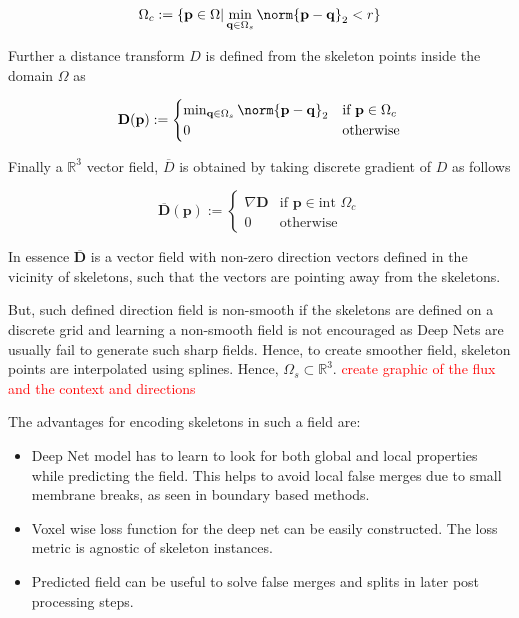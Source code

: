 \DeclarePairedDelimiter\norm\lVert\rVert

\begin{equation}
{\Omega}_c := \{ \mathbf{p} \in \Omega \vert \min_{\mathbf{q} \in \Omega_s} \norm{\mathbf{p} - \mathbf{q}}_2 < r \} 
\end{equation}

Further a distance transform $D$ is defined from the skeleton points inside the domain $\Omega$ as

\begin{equation}
\mathbf{D}(\mathbf{p}) := \begin{cases}
		\min_{\mathbf{q} \in \Omega_s} \norm{\mathbf{p}-\mathbf{q}}_2 & \text{if } \mathbf{p} \in \Omega_c \\
		0  & \text{otherwise}
		\end{cases} 
\end{equation}

Finally a $\mathbb{R}^3$ vector field, $\overline{D}$ is obtained by taking discrete gradient of $D$ as follows

\begin{equation}
 \overline{\mathbf{D}}(\mathbf{p}) := \begin{cases}
 \nabla \mathbf{D} & \text{if } \mathbf{p} \in \text{int } \Omega_c \\
 0  & \text{otherwise}
 \end{cases} 
\end{equation}
 
In essence $\overline{\mathbf{D}}$ is a vector field with non-zero direction vectors defined in the vicinity of skeletons, such that the vectors are pointing away from the skeletons.

But, such defined direction field is non-smooth if the skeletons are defined on a discrete grid and learning a non-smooth field is not encouraged as Deep Nets are usually fail to generate such sharp fields. Hence, to create smoother field, skeleton points are interpolated using splines. Hence, $\Omega_s \subset \mathbb{R}^3$. \textcolor{red}{create graphic of the flux and the context and directions}

The advantages for encoding skeletons in such a field are:
\begin{itemize}
	\item Deep Net model has to learn to look for both global and local properties while predicting the field. This helps to avoid local false merges due to small membrane breaks, as seen in boundary based methods.
	\item Voxel wise loss function for the deep net can be easily constructed. The loss metric is agnostic of skeleton instances.
	\item Predicted field can be useful to solve false merges and splits in later post processing steps.
\end{itemize}

